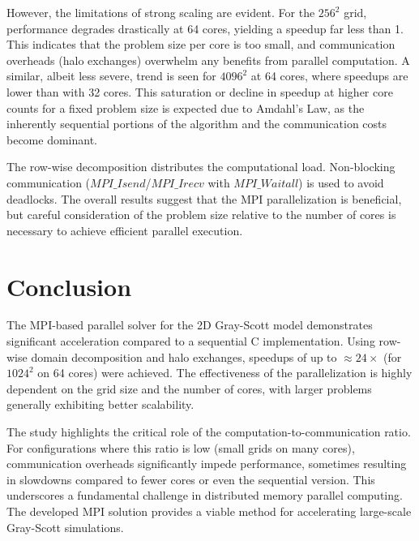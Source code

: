 \documentclass[9pt]{IEEEtran} %
\begin{document}
However, the limitations of strong scaling are evident. For the $256^2$ grid, performance degrades drastically at 64 cores, yielding a speedup far less than 1. This indicates that the problem size per core is too small, and communication overheads (halo exchanges) overwhelm any benefits from parallel computation. A similar, albeit less severe, trend is seen for $4096^2$ at 64 cores, where speedups are lower than with 32 cores. This saturation or decline in speedup at higher core counts for a fixed problem size is expected due to Amdahl's Law, as the inherently sequential portions of the algorithm and the communication costs become dominant.

The row-wise decomposition distributes the computational load. Non-blocking communication ($MPI\_Isend$/$MPI\_Irecv$ with $MPI\_Waitall$) is used to avoid deadlocks. The overall results suggest that the MPI parallelization is beneficial, but careful consideration of the problem size relative to the number of cores is necessary to achieve efficient parallel execution.

\section{Conclusion}
\label{sec:conclusion}

The MPI-based parallel solver for the 2D Gray-Scott model demonstrates significant acceleration compared to a sequential C implementation. Using row-wise domain decomposition and halo exchanges, speedups of up to $\approx 24\times$ (for $1024^2$ on 64 cores) were achieved. The effectiveness of the parallelization is highly dependent on the grid size and the number of cores, with larger problems generally exhibiting better scalability.

The study highlights the critical role of the computation-to-communication ratio. For configurations where this ratio is low (small grids on many cores), communication overheads significantly impede performance, sometimes resulting in slowdowns compared to fewer cores or even the sequential version. This underscores a fundamental challenge in distributed memory parallel computing. The developed MPI solution provides a viable method for accelerating large-scale Gray-Scott simulations.
\end{document}
